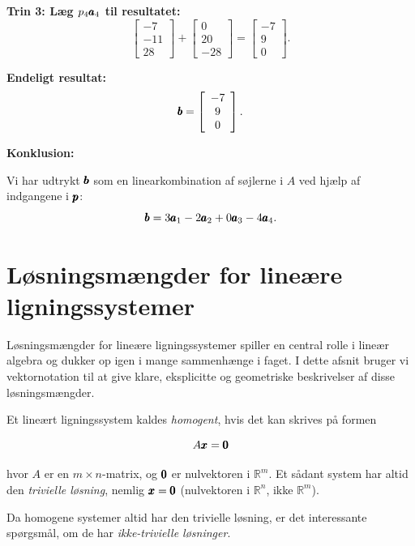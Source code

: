 \begin{solution}
    \textbf{Trin 3: Læg $p_4 \pmb{a}_4$ til resultatet:}
    \[
    \left[\begin{array}{c}
    -7 \\
    -11 \\
    28
    \end{array}\right] + \left[\begin{array}{c}
    0 \\
    20 \\
    -28
    \end{array}\right] = \left[\begin{array}{c}
    -7 \\
    9 \\
    0
    \end{array}\right].
    \]
    
    \textbf{Endeligt resultat:}
    \[
    \pmb{b} = \left[\begin{array}{c}
    -7 \\
    9 \\
    0
    \end{array}\right].
    \]
    
    \textbf{Konklusion:}
    
    Vi har udtrykt $\pmb{b}$ som en linearkombination af søjlerne i $A$ ved hjælp af indgangene i $\pmb{p}$:
    \[
    \pmb{b} = 3 \pmb{a}_1 - 2 \pmb{a}_2 + 0 \pmb{a}_3 - 4 \pmb{a}_4.
    \]
\end{solution}

\section{Løsningsmængder for lineære ligningssystemer}
Løsningsmængder for lineære ligningssystemer spiller en central rolle i lineær algebra og dukker op igen i mange sammenhænge i faget. I dette afsnit bruger vi vektornotation til at give klare, eksplicitte og geometriske beskrivelser af disse løsningsmængder.

Et lineært ligningssystem kaldes \textit{homogent}, hvis det kan skrives på formen

\[
A \pmb{x} = \pmb{0}
\]

hvor $A$ er en $m \times n$-matrix, og $\pmb{0}$ er nulvektoren i $\mathbb{R}^m$. Et sådant system har altid den \textit{trivielle løsning}, nemlig $\pmb{x} = \pmb{0}$ (nulvektoren i $\mathbb{R}^n$, ikke $\mathbb{R}^m$).

Da homogene systemer altid har den trivielle løsning, er det interessante spørgsmål, om de har \textit{ikke-trivielle løsninger}.

